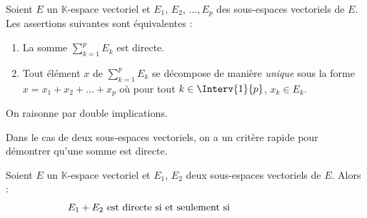 \documentclass[a4paper,10pt]{report}
\newcommand{\Sum}[2]{\ensuremath{\textstyle{\sum\limits_{#1}^{#2}}}}
\begin{document}
\begin{Proposition}{}
Soient $E$ un $\mathbb{K}$-espace vectoriel et $E_1$, $E_2$, $\ldots, E_p$ des sous-espaces vectoriels de $E$. Les assertions suivantes sont équivalentes :
\begin{enumerate}
\item La somme $\Sum{k=1}{p} E_k$ est directe.
\item Tout élément $x$ de $\Sum{k=1}{p} E_k$ se décompose de manière \emph{unique} sous la forme $x = x_1 + x_2 + \ldots + x_p$ où pour tout $k \in \Interv{1}{p}$, $x_k \in E_k$.
\end{enumerate}
\end{Proposition}

\begin{Demonstration}{} On raisonne par double implications.



\vspace{10cm}

\newpage

\phantom{bla}

\vspace{8.5cm}
%
%
\end{Demonstration}
 
 Dans le cas de deux sous-espaces vectoriels, on a un critère rapide pour démontrer qu'une somme est directe.
 
 \begin{Proposition}{}\label{SommeDir2}
 Soient $E$ un $\mathbb{K}$-espace vectoriel et $E_1$, $E_2$ deux sous-espaces vectoriels de $E$. Alors :
 $$ E_1 + E_2 \hbox{ est directe si et seulement si }\phantom{ E_1 \cap E_2 = \lbrace 0_E \rbrace} $$
 \end{Proposition}
 
\end{document}

